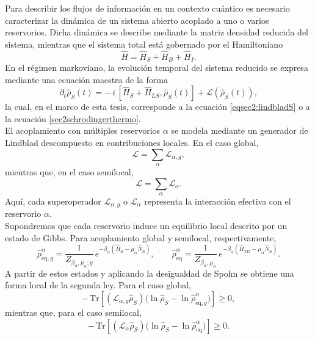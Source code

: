 Para describir los flujos de información en un contexto cuántico es necesario caracterizar la dinámica de un sistema abierto acoplado a uno o varios reservorios. Dicha dinámica se describe mediante la matriz densidad reducida del sistema, mientras que el sistema total está gobernado por el Hamiltoniano
\[
\hat{H}=\hat{H}_{S}+\hat{H}_{B}+\hat{H}_{I}.
\]
En el régimen markoviano, la evolución temporal del sistema reducido se expresa mediante una ecuación maestra de la forma
\begin{equation*}
    \partial_{t}\hat{\rho}_{S}(t)
    = -\,i\,[\hat{H}_{S}+\hat{H}_{LS},\hat{\rho}_{S}(t)]
      + \mathcal{L}(\hat{\rho}_{S}(t)),
\end{equation*}
la cual, en el marco de esta tesis, corresponde a la ecuación \eqref{eqsec2:lindbladS} o a la ecuación \eqref{sec2schrodingerthermo}.
\\

El acoplamiento con múltiples reservorios $\alpha$ se modela mediante un generador de Lindblad descompuesto en contribuciones locales. En el caso global,
\begin{equation*}
    \mathcal{L}=\sum_{\alpha}\mathcal{L}_{\alpha,g},
\end{equation*}
mientras que, en el caso semilocal,
\begin{equation*}
    \mathcal{L}=\sum_{\alpha}\mathcal{L}_{\alpha}.
\end{equation*}
Aquí, cada superoperador $\mathcal{L}_{\alpha,g}$ o $\mathcal{L}_{\alpha}$ representa la interacción efectiva con el reservorio $\alpha$.
\\

Supondremos que cada reservorio induce un equilibrio local descrito por un estado de Gibbs. Para acoplamiento global y semilocal, respectivamente,
\[
\hat{\rho}_{\mathrm{eq},g}^{\alpha}
=\frac{1}{Z_{\beta_{\alpha},\mu_{\alpha};g}}
\,e^{-\beta_{\alpha}(\hat{H}_{S}-\mu_{\alpha}\hat{N}_{S})},
\qquad
\hat{\rho}_{\mathrm{eq}}^{\alpha}
=\frac{1}{Z_{\beta_{\alpha},\mu_{\alpha}}}
\,e^{-\beta_{\alpha}(\hat{H}_{TD}-\mu_{\alpha}\hat{N}_{S})}.
\]
A partir de estos estados y aplicando la desigualdad de Spohn \cite{spohn1978entropy} se obtiene una forma local de la segunda ley. Para el caso global,
\begin{equation}
    -\,\mathrm{Tr}\!\left[(\mathcal{L}_{\alpha,g}\hat{\rho}_{S})
      \big(\ln\hat{\rho}_{S}-\ln\hat{\rho}_{\mathrm{eq},g}^{\alpha}\big)\right]\ge 0,
    \label{spohninfo}
\end{equation}
mientras que, para el caso semilocal,
\begin{equation}
    -\,\mathrm{Tr}\!\left[(\mathcal{L}_{\alpha}\hat{\rho}_{S})
      \big(\ln\hat{\rho}_{S}-\ln\hat{\rho}_{\mathrm{eq}}^{\alpha}\big)\right]\ge 0.
    \label{spohninfolocal}
\end{equation}

